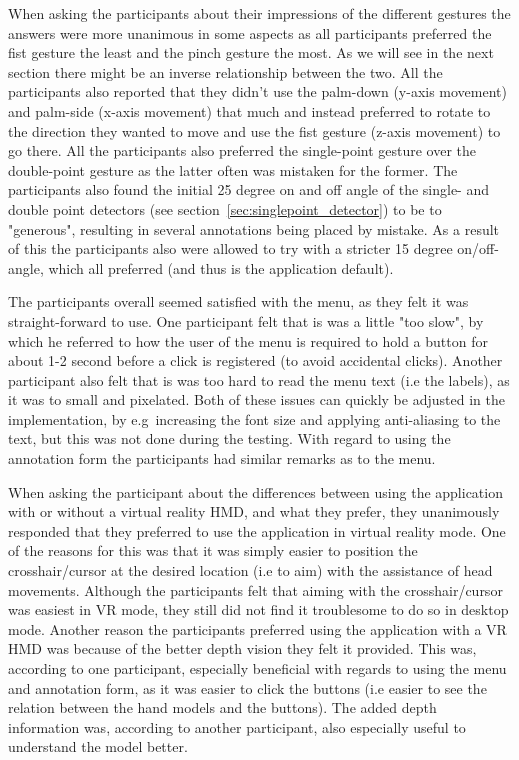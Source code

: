 When asking the participants about their impressions of the different gestures the answers were more unanimous in some aspects
as all participants preferred the fist gesture the least and the pinch gesture the most. As we will see in the next section there might be an inverse relationship between the two.
All the participants also reported that they didn't use the palm-down (y-axis movement) and palm-side (x-axis movement) that much and instead preferred to rotate to the 
direction they wanted to move and use the fist gesture (z-axis movement) to go there. All the participants also preferred the single-point gesture over the double-point gesture as 
the latter often was mistaken for the former. The participants also found the initial 25 degree on and off angle of the single- and double point detectors 
(see section~\vref{sec:singlepoint_detector}) to be to "generous", resulting in several annotations being placed by mistake. 
As a result of this the participants also were allowed to try with a stricter 15 degree on/off-angle, which all preferred (and thus is the application default).

The participants overall seemed satisfied with the menu, as they felt it was straight-forward to use. One participant felt that is was a little "too slow", by which
he referred to how the user of the menu is required to hold a button for about 1-2 second before a click is registered (to avoid accidental clicks).
Another participant also felt that is was too hard to read the menu text (i.e the labels), as it was to small and pixelated. Both of these issues 
can quickly be adjusted in the implementation, by e.g~increasing the font size and applying anti-aliasing to the text, but this was not done during the testing.
With regard to using the annotation form the participants had similar remarks as to the menu. 

When asking the participant about the differences between using the application with or without a virtual reality HMD, and what they prefer, they unanimously responded
that they preferred to use the application in virtual reality mode. One of the reasons for this was that it was simply easier to position the crosshair/cursor at the 
desired location (i.e to aim) with the assistance of head movements. Although the participants felt that aiming with the crosshair/cursor was easiest in VR mode, they still 
did not find it troublesome to do so in desktop mode. Another reason the participants preferred using the application with a VR HMD was because of the 
better depth vision they felt it provided. This was, according to one participant, especially beneficial with regards to using the menu and annotation form, as it 
was easier to click the buttons (i.e easier to see the relation between the hand models and the buttons). The added depth information was, according to another participant, 
also especially useful to understand the model better. 

